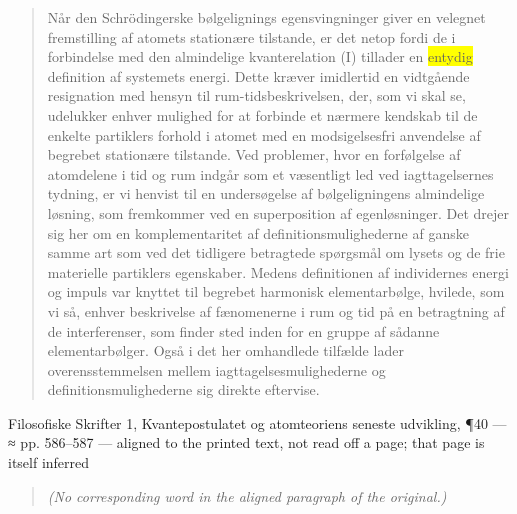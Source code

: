 \documentclass[11pt]{article}
\newcommand{\dcite}[1]{{\nopagebreak\raggedleft\small #1\par}\medskip}
\newcommand{\tlg}[1]{{\setlength{\fboxsep}{0.8pt}\colorbox{yellow}{#1}}}
\begin{document}
\begin{quote}
Når den Schrödingerske bølgelignings egensvingninger giver en velegnet fremstilling af atomets stationære tilstande, er det netop fordi de i forbindelse med den almindelige kvanterelation (I) tillader en \tlg{entydig} definition af systemets energi. Dette kræver imidlertid en vidtgående resignation med hensyn til rum-tidsbeskrivelsen, der, som vi skal se, udelukker enhver mulighed for at forbinde et nærmere kendskab til de enkelte partiklers forhold i atomet med en modsigelsesfri anvendelse af begrebet stationære tilstande. Ved problemer, hvor en forfølgelse af atomdelene i tid og rum indgår som et væsentligt led ved iagttagelsernes tydning, er vi henvist til en undersøgelse af bølgeligningens almindelige løsning, som fremkommer ved en superposition af egenløsninger. Det drejer sig her om en komplementaritet af definitionsmulighederne af ganske samme art som ved det tidligere betragtede spørgsmål om lysets og de frie materielle partiklers egenskaber. Medens definitionen af individernes energi og impuls var knyttet til begrebet harmonisk elementarbølge, hvilede, som vi så, enhver beskrivelse af fænomenerne i rum og tid på en betragtning af de interferenser, som finder sted inden for en gruppe af sådanne elementarbølger. Også i det her omhandlede tilfælde lader overensstemmelsen mellem iagttagelsesmulighederne og definitionsmulighederne sig direkte eftervise.
\end{quote}
\dcite{Filosofiske Skrifter 1, Kvantepostulatet og atomteoriens seneste udvikling, ¶40 — ≈ pp. 586–587 — aligned to the printed text, not read off a page; that page is itself inferred}
{\footnotesize\begin{quote}\itshape (No corresponding word in the aligned paragraph of the original.)\end{quote}}
\end{document}
